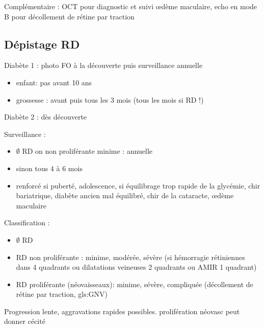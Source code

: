 \documentclass{book}
\begin{document}
Complémentaire : OCT pour diagnostic et suivi \oe{}dème maculaire, echo en mode B
pour décollement de rétine par traction

\subsection{Dépistage RD}
\label{sec:orga82b4a1}
Diabète 1 : photo FO à la découverte puis surveillance annuelle
\begin{itemize}
\item enfant: pas avant 10 ans
\item grossesse : avant puis tous les 3 mois (tous les mois si RD !)
\end{itemize}
Diabète 2 : dès découverte

Surveillance :
\begin{itemize}
\item \(\emptyset\) RD on non proliférante minime : annuelle
\item sinon tous 4 à 6 mois
\item renforcé si puberté, adolescence, si équilibrage trop rapide de la glycémie,
chir bariatrique, diabète ancien mal équilibré, chir de la cataracte,
\oe{}dème maculaire
\end{itemize}

Classification :
\begin{itemize}
\item \(\emptyset\) RD
\item RD non proliférante : minime, modérée, sévère (si hémorragie rétiniennes dans 4
quadrants ou dilatations veineuses 2 quadrants ou AMIR 1 quadrant)
\item RD proliférante (néovaisseaux): minime, sévère, compliquée (décollement de
rétine par traction, gls:GNV)
\end{itemize}

Progression lente, aggravations rapides possibles. \danger prolifération néovasc
peut donner cécité 
\end{document}
